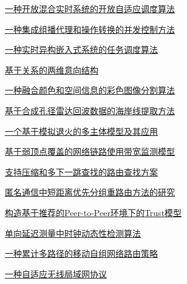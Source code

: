 \documentclass[a4paper]{article}
\begin{document}
\href{http://www.jos.org.cn/ch/reader/download_pdf.aspx?file_no=20040402&year_id=2004&quarter_id=4&falg=1}{一种开放混合实时系统的开放自适应调度算法}

\href{http://www.jos.org.cn/ch/reader/download_pdf.aspx?file_no=20040403&year_id=2004&quarter_id=4&falg=1}{一种集成组播代理和操作转换的并发控制方法}

\href{http://www.jos.org.cn/ch/reader/download_pdf.aspx?file_no=20040404&year_id=2004&quarter_id=4&falg=1}{一种实时异构嵌入式系统的任务调度算法}

\href{http://www.jos.org.cn/ch/reader/download_pdf.aspx?file_no=20040405&year_id=2004&quarter_id=4&falg=1}{基于关系的两维意向结构}

\href{http://www.jos.org.cn/ch/reader/download_pdf.aspx?file_no=20040406&year_id=2004&quarter_id=4&falg=1}{一种融合颜色和空间信息的彩色图像分割算法}

\href{http://www.jos.org.cn/ch/reader/download_pdf.aspx?file_no=20040407&year_id=2004&quarter_id=4&falg=1}{基于合成孔径雷达回波数据的海岸线提取方法}

\href{http://www.jos.org.cn/ch/reader/download_pdf.aspx?file_no=20040408&year_id=2004&quarter_id=4&falg=1}{一个基于模拟退火的多主体模型及其应用}

\href{http://www.jos.org.cn/ch/reader/download_pdf.aspx?file_no=20040409&year_id=2004&quarter_id=4&falg=1}{基于弱顶点覆盖的网络链路使用带宽监测模型}

\href{http://www.jos.org.cn/ch/reader/download_pdf.aspx?file_no=20040410&year_id=2004&quarter_id=4&falg=1}{支持压缩和多下一跳查找的路由查找方案}

\href{http://www.jos.org.cn/ch/reader/download_pdf.aspx?file_no=20040411&year_id=2004&quarter_id=4&falg=1}{匿名通信中短距离优先分组重路由方法的研究}

\href{http://www.jos.org.cn/ch/reader/download_pdf.aspx?file_no=20040412&year_id=2004&quarter_id=4&falg=1}{构造基于推荐的Peer-to-Peer环境下的Trust模型}

\href{http://www.jos.org.cn/ch/reader/download_pdf.aspx?file_no=20040413&year_id=2004&quarter_id=4&falg=1}{单向延迟测量中时钟动态性检测算法}

\href{http://www.jos.org.cn/ch/reader/download_pdf.aspx?file_no=20040414&year_id=2004&quarter_id=4&falg=1}{一种累计多路径的移动自组网络路由策略}

\href{http://www.jos.org.cn/ch/reader/download_pdf.aspx?file_no=20040415&year_id=2004&quarter_id=4&falg=1}{一种自适应无线局域网协议}
\end{document}
